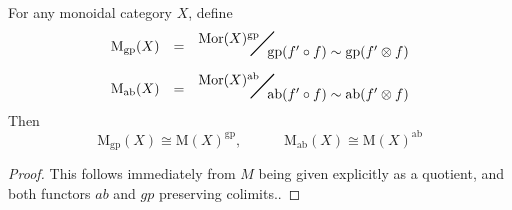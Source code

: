 \documentclass{amsbook} %
\newcommand{\bigquotient}[2]{ \raisebox{0.75\height}{$#1$} \mkern-12mu\scalebox{2}{$\diagup$}\mkern-10mu \raisebox{-0.5\height}{$#2$} }
\numberwithin{section}{chapter}
\begin{document}
\begin{lem}\label{Morder} For any monoidal category $X$, define
\[ \begin{array}{rll} 
			\mathrm{M}_{\mathrm{gp}}(X) & = & \bigquotient{\mathrm{Mor}(X)^{\mathrm{gp}}}{\mathrm{gp}(f' \circ f) \sim \mathrm{gp}(f' \otimes f)} \\[\bigskipamount]
			\mathrm{M}_{\mathrm{ab}}(X) & = & \bigquotient{\mathrm{Mor}(X)^{\mathrm{ab}}}{\mathrm{ab}(f' \circ f) \sim \mathrm{ab}(f' \otimes f)}
		\end{array}
\] 
Then
\[ \mathrm{M}_{\mathrm{gp}}(X) \cong \mathrm{M}(X)^{\mathrm{gp}}, \quad \quad \quad \mathrm{M}_{\mathrm{ab}}(X) \cong \mathrm{M}(X)^{\mathrm{ab}} \]
\end{lem}
\begin{proof}
This follows immediately from $M$ being given explicitly as a quotient, and both functors $ab$ and $gp$ preserving colimits..


\end{proof}
\end{document}

